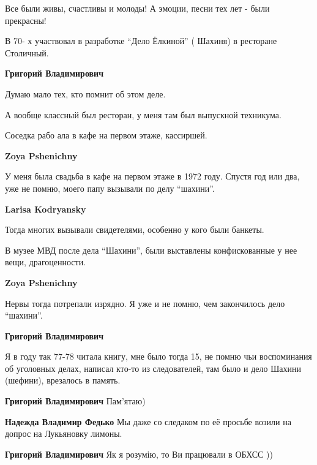 \begin{itemize}
\begin{itemize}
Все были живы, счастливы и молоды! А эмоции, песни тех лет - были прекрасны!
\end{itemize} %


В 70- х участвовал в разработке \enquote{Дело Ёлкиной} ( Шахиня) в ресторане
Столичный.

\begin{itemize} %
\textbf{Григорий Владимирович} 

Думаю мало тех, кто помнит об этом деле.

А вообще классный был ресторан, у меня там был выпускной техникума.

Соседка рабо ала в кафе на первом этаже, кассиршей.

\begin{itemize} %
\textbf{Zoya Pshenichny} 

У меня была свадьба в кафе на первом этаже в 1972 году. Спустя год или два, уже
не помню, моего папу вызывали по делу \enquote{шахини}.

\textbf{Larisa Kodryansky} 

Тогда многих вызывали свидетелями, особенно у кого были банкеты.

В музее МВД после дела \enquote{Шахини}, были выставлены конфискованные у нее вещи,
драгоценности.

\textbf{Zoya Pshenichny} 

Нервы тогда потрепали изрядно. Я уже и не помню, чем закончилось дело \enquote{шахини}.

\end{itemize} %

\textbf{Григорий Владимирович} 

Я в году так 77-78 читала книгу, мне было тогда 15, не помню чьи воспоминания
об уголовных делах, написал кто-то из следователей, там было и дело Шахини
(шефини), врезалось в память.

\textbf{Григорий Владимирович} Пам'ятаю)

\begin{itemize} %
\textbf{Надежда Владимир Федько} Мы даже со следаком по её просьбе возили на допрос на Лукьяновку лимоны.

\textbf{Григорий Владимирович} Як я розумію, то Ви працювали в ОБХСС ))
\end{itemize} %


\end{itemize}
\end{itemize}
